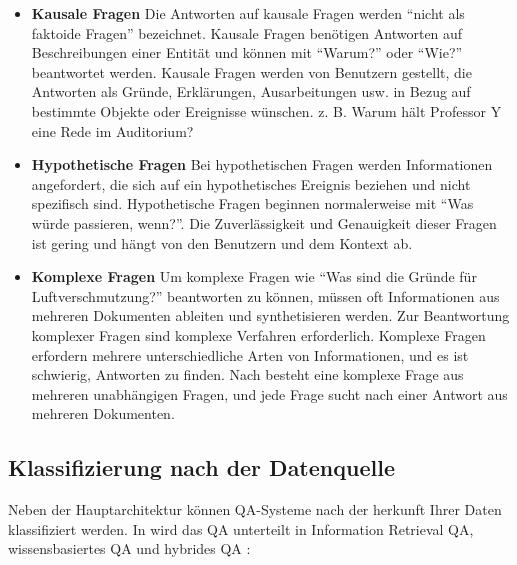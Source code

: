 \documentclass[
        ngerman,
        paper=a4,
        numbers=noendperiod,
]{scrreprt}
\begin{document}
\begin{itemize}
    \item \textbf{Kausale Fragen} 
    Die Antworten auf kausale Fragen werden \enquote{nicht als faktoide Fragen} bezeichnet. Kausale Fragen benötigen Antworten auf Beschreibungen einer Entität und können mit \enquote{Warum?} oder \enquote{Wie?} beantwortet werden. Kausale Fragen werden von Benutzern gestellt, die Antworten als Gründe, Erklärungen, Ausarbeitungen usw. in Bezug auf bestimmte Objekte oder Ereignisse wünschen.
    z. B. Warum hält Professor Y eine Rede im Auditorium?
    \item \textbf{Hypothetische Fragen}
    Bei hypothetischen Fragen werden Informationen angefordert, die sich auf ein hypothetisches Ereignis beziehen und nicht spezifisch sind. Hypothetische Fragen beginnen normalerweise mit \enquote{Was würde passieren, wenn?}. Die Zuverlässigkeit und Genauigkeit dieser Fragen ist gering und hängt von den Benutzern und dem Kontext ab.
    \item \textbf{Komplexe Fragen}
    Um komplexe Fragen wie \enquote{Was sind die Gründe für Luftverschmutzung?} beantworten zu können, müssen oft Informationen aus mehreren Dokumenten ableiten und synthetisieren werden. Zur Beantwortung komplexer Fragen sind komplexe Verfahren erforderlich. Komplexe Fragen erfordern mehrere unterschiedliche Arten von Informationen, und es ist schwierig, Antworten zu finden. Nach \citep{basuki2016statistical} besteht eine komplexe Frage aus mehreren unabhängigen Fragen, und jede Frage sucht nach einer Antwort aus mehreren Dokumenten.
    
\end{itemize}


\subsection{Klassifizierung nach der Datenquelle}
Neben der Hauptarchitektur können QA-Systeme nach der herkunft Ihrer Daten klassifiziert werden. In \citep{Jurafsky2014SpeechProcessing} wird das QA unterteilt in Information Retrieval QA,  wissensbasiertes QA und hybrides QA \citep{Ojokoh2019ASystems}:


\end{document}
